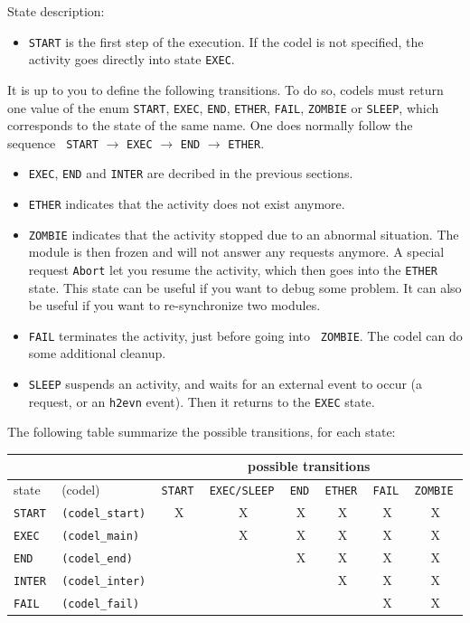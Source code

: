 \bigbreak

State description:

\begin{itemize}
\item {\tt START} is the first step of the execution. If the codel is not
specified, the activity goes directly into state {\tt EXEC}.
\end{itemize}

It is up  to you to define the   following transitions. To  do so, codels
must return one value of  the enum {\tt  START},  {\tt EXEC}, {\tt  END},
{\tt ETHER},  {\tt FAIL}, {\tt  ZOMBIE} or {\tt SLEEP}, which corresponds
to the state of the same name. One does normally follow the sequence {\tt
START} $\rightarrow$ {\tt   EXEC} $\rightarrow$  {\tt  END} $\rightarrow$
{\tt ETHER}.

\begin{itemize}
\item {\tt EXEC}, {\tt END} and {\tt INTER} are decribed in the previous
sections.

\item {\tt ETHER} indicates that the activity does not exist anymore.

\item {\tt ZOMBIE} indicates that the activity stopped due to an abnormal
situation. The module  is then  frozen and  will not answer  any requests
anymore. A special request {\tt Abort} let you resume the activity, which
then  goes into the  {\tt ETHER} state. This  state can  be useful if you
want  to debug  some problem.  It   can also be  useful   if you want  to
re-synchronize two modules.

\item {\tt FAIL} terminates the activity, just before going into {\tt
ZOMBIE}. The codel can do some additional cleanup.

\item {\tt SLEEP} suspends an activity, and waits for an external event
to occur (a request,  or an {\tt  h2evn} event). Then  it returns  to the
{\tt EXEC} state.
\end{itemize}

The following table summarize the possible transitions, for each state:

\bigbreak

{\small\begin{tabular}{|ll||c|c|c|c|c|c|}
\cline{3-8}
\multicolumn{2}{c}{} & \multicolumn{6}{|c|}{possible transitions} \\
\hline
state & (codel) & \tt START & \tt EXEC/SLEEP & \tt END & \tt ETHER & \tt FAIL & \tt ZOMBIE \\
\hline
\tt START  & \tt (codel\_start)	& X & X & X & X & X & X \\
\tt EXEC   & \tt (codel\_main) 	&   & X & X & X & X & X \\
\tt END    & \tt (codel\_end) 	&   &   & X & X & X & X \\
\tt INTER  & \tt (codel\_inter) &   &   &   & X & X & X \\
\tt FAIL   & \tt (codel\_fail) 	&   &   &   &   & X & X \\
\hline
\end{tabular}}

